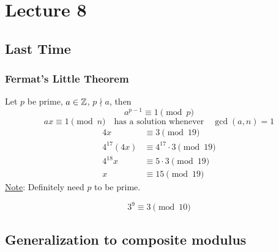 \chapter{Lecture 8}
\date{September 19, 2024}

\section{Last Time}
    \subsection{Fermat's Little Theorem}
        Let $p$ be prime, $a\in\mathbb{Z}$, $p\nmid a$, then 
        \[ a^{p-1}\equiv 1\pmod{p} \]
        \[ ax\equiv 1\pmod{n} \quad\text{has a solution whenever}\quad \gcd(a,n)=1 \]
        \begin{align*}
            4x &\equiv 3\pmod{19} \\
            4^{17}(4x) &\equiv 4^{17}\cdot 3\pmod{19} \\
            4^{18}x &\equiv 5\cdot 3\pmod{19} \\
            x &\equiv 15\pmod{19}
        \end{align*}
        \underline{Note}: Definitely need $p$ to be prime.
    \begin{example}
        \[ 3^9\equiv 3\pmod{10} \]
    \end{example}

\section{Generalization to composite modulus}
